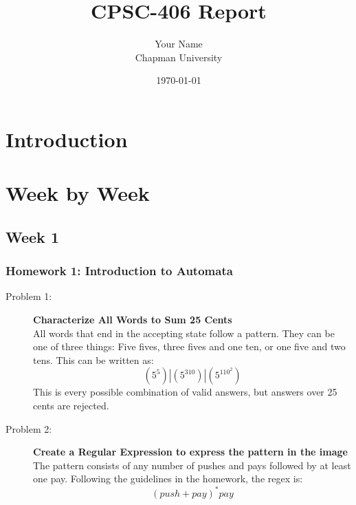 \documentclass{article}
\title{CPSC-406 Report}
\author{Your Name  \\ Chapman University}
\date{\today}
\theoremstyle{theorem}
\theoremstyle{definition}
\theoremstyle{remark}
\begin{document}
\maketitle

\begin{abstract}
\end{abstract}

\setcounter{tocdepth}{3}
\tableofcontents

\section{Introduction}\label{intro}

\section{Week by Week}\label{homework}

\subsection{Week 1}

\subsubsection{Homework 1: Introduction to Automata}
\begin{description}
    \item[Problem 1:] \textbf{Characterize All Words to Sum 25 Cents}\\
    All words that end in the accepting state follow a pattern. They can be one of three things: Five fives, three fives and one ten, or one five and two tens. This can be written as:
    $$(5^5) | (5^310) | (5^110^2)$$
    This is every possible combination of valid answers, but answers over 25 cents are rejected.
    
    \item[Problem 2:] \textbf{Create a Regular Expression to express the pattern in the image}\\
    The pattern consists of any number of pushes and pays followed by at least one pay. Following the guidelines in the homework, the regex is:
    \[ (push + pay)^* pay \]
\end{description}
\end{document}
